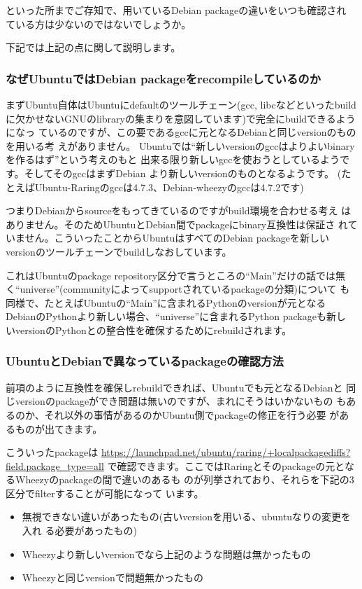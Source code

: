 \documentclass[mingoth,a4paper]{jsarticle}
\begin{document}
といった所までご存知で、用いているDebian packageの違いをいつも確認され
ている方は少ないのではないでしょうか。

下記では上記の点に関して説明します。

\subsubsection{なぜUbuntuではDebian packageをrecompileしているのか}

まずUbuntu自体はUbuntuにdefaultのツールチェーン(gcc,
libcなどといったbuild
に欠かせないGNUのlibraryの集まりを意図しています)で完全にbuildできるようになっ
ているのですが、この要であるgccに元となるDebianと同じversionのものを用いる考
えがありません。
Ubuntuでは``新しいversionのgccはよりよいbinaryを作るはず''という考えのもと
出来る限り新しいgccを使おうとしているようです。そしてそのgccはまずDebian
より新しいversionのものとなるようです。
(たとえばUbuntu-Raringのgccは4.7.3、Debian-wheezyのgccは4.7.2です)

つまりDebianからsourceをもってきているのですがbuild環境を合わせる考え
はありません。そのためUbuntuとDebian間でpackageにbinary互換性は保証さ
れていません。こういったことからUbuntuはすべてのDebian packageを新しい
versionのツールチェーンでbuildしなおしています。

これはUbuntuのpackage repository区分で言うところの``Main''だけの話では無
く``universe''(communityによってsupportされているpackageの分類)について
も同様で、たとえばUbuntuの``Main''に含まれるPythonのversionが元となる
DebianのPythonより新しい場合、``universe''に含まれるPython packageも新し
いversionのPythonとの整合性を確保するためにrebuildされます。

\subsubsection{UbuntuとDebianで異なっているpackageの確認方法}

前項のように互換性を確保しrebuildできれば、Ubuntuでも元となるDebianと
同じversionのpackageができ問題は無いのですが、まれにそうはいかないもの
もあるのか、それ以外の事情があるのかUbuntu側でpackageの修正を行う必要
があるものが出てきます。

こういったpackageは
\url{https://launchpad.net/ubuntu/raring/+localpackagediffs?field.package_type=all}
で確認できます。ここではRaringとそのpackageの元となるWheezyのpackageの間で違いのあるも
のが列挙されており、それらを下記の3区分でfilterすることが可能になって
います。

\begin{itemize}
\itemsep1pt\parskip0pt
\item
  無視できない違いがあったもの(古いversionを用いる、ubuntuなりの変更を入れ
  る必要があったもの)
\item
  Wheezyより新しいversionでなら上記のような問題は無かったもの
\item
  Wheezyと同じversionで問題無かったもの
\end{itemize}
\end{document}
